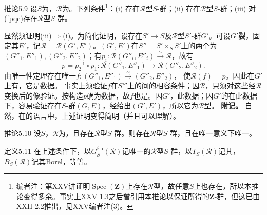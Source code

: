 \begin{SGAresult}{推论}{5.9}
设$S$为，$\mathcal R$为。下列条件\footnote{编者注：第XXV讲证明$\operatorname{Spec}(\mathbf Z)$上存在$\mathcal R$型，故任意$S$上也存在，所以本推论变得多余。事实上XXV 1.3之后曾引用本推论以保证所得的$\mathbf Z$-群，但这已由XXII 2.2推出，见XXV编者注(3)。}：(i) 存在$\mathcal R$型$S$-群；(ii) 存在$\mathcal R$型$S$-群；(iii) 对(fpqc)存在$\mathcal R$型$S$-群。
\end{SGAresult}
显然须证明(iii)$\Rightarrow$(i)。为简化证明，设存在$S'\to S$及$\mathcal R$型$S'$-群$G'$。可设$G'$裂，固定其$E'$，记$\mathcal R=\mathcal R(G',E')$。$(G',E')$在$S''=S'\times_S S'$上的两个为$(G''_1,E''_1),(G''_2,E''_2)$；有$p_i:\mathcal R(G''_i,E''_i)\xrightarrow\sim\mathcal R$，故有
\[p=p_2^{-1}\circ p_1:\mathcal R(G''_1,E''_1)\longrightarrow\mathcal R(G''_2,E''_2).\]
由唯一性定理存在唯一$f:(G''_1,E''_1)\xrightarrow\sim(G''_2,E''_2)$，
使$\mathcal R(f)=p$。因此在$G'$上有，它是数据。
事实上须验证$f$在$S'''$上的间的相容条件；因$\mathcal R$，只须对这些经$\mathcal R$变换后的像验证。按构造$p$确为数据，故$f$也是。因$G'$，此数据；因$G'$的在此数据下，容易验证存在$S$-群$(G,E)$，经给出$(G',E')$，所以它为$\mathcal R$型。
\textbf{附记。} 自然，在的语言中，上述证明变得简明（并且可以理解）。
\begin{SGAresult}{推论}{5.10}
设$S$，$\mathcal R$为，且存在$\mathcal R$型$S$-群。则存在$\mathcal R$型$S$-群，且在唯一意义下唯一。
\end{SGAresult}
\begin{SGAresult}{定义}{5.11}
在上述条件下，以$G_S^{\mathrm{Ép}}(\mathcal R)$记唯一的$\mathcal R$型$S$-群，以$T_S(\mathcal R)$记其，$B_S(\mathcal R)$记其Borel，等等。
\end{SGAresult}
